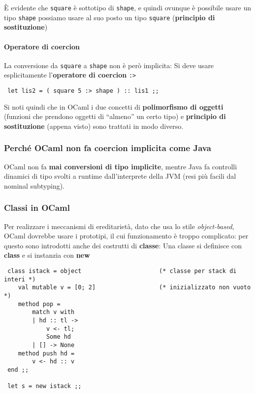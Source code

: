 \documentclass[a4paper,10pt]{article}
\begin{document}
È evidente che \texttt{square} è sottotipo di \texttt{shape}, e quindi ovunque è possibile usare un tipo \texttt{shape} possiamo usare al suo posto un tipo \texttt{square} (\textbf{principio di sostituzione})

\paragraph{Operatore di coercion} La conversione da \texttt{square} a \texttt{shape} non è però implicita: Si deve usare esplicitamente l'\textbf{operatore di coercion} \texttt{:>}

\begin{lstlisting}
 let lis2 = ( square 5 :> shape ) :: lis1 ;;
\end{lstlisting}

Si noti quindi che in OCaml i due concetti di \textbf{polimorfismo di oggetti} (funzioni che prendono oggetti di ``almeno'' un certo tipo) e \textbf{principio di sostituzione} (appena visto) sono trattati in modo diverso.

\subsubsection{Perché OCaml non fa coercion implicita come Java}

OCaml non fa \textbf{mai conversioni di tipo implicite}, mentre Java fa controlli dinamici di tipo svolti a runtime dall'interprete della JVM (resi più facili dal nominal subtyping).

\subsubsection{Classi in OCaml}
Per realizzare i meccanismi di ereditarietà, dato che usa lo stile \emph{object-based}, OCaml dovrebbe usare i prototipi, il cui funzionamento è troppo complicato: per questo sono introdotti anche dei costrutti di \textbf{classe}: Una classe si definisce con \textbf{class} e si instanzia con \textbf{new}

\begin{lstlisting}
 class istack = object                      (* classe per stack di interi *)
    val mutable v = [0; 2]                  (* inizializzato non vuoto *)
    method pop =
        match v with
        | hd :: tl ->
            v <- tl; 
            Some hd
        | [] -> None
    method push hd =
        v <- hd :: v
 end ;;

 let s = new istack ;;
\end{lstlisting}
\end{document}
